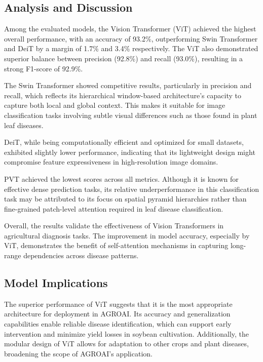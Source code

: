 \documentclass[preprint,12pt]{elsarticle}
\begin{document}
\subsection{Analysis and Discussion}

Among the evaluated models, the Vision Transformer (ViT) achieved the highest overall performance, with an accuracy of 93.2\%, outperforming Swin Transformer and DeiT by a margin of 1.7\% and 3.4\% respectively. The ViT also demonstrated superior balance between precision (92.8\%) and recall (93.0\%), resulting in a strong F1-score of 92.9\%.

The Swin Transformer showed competitive results, particularly in precision and recall, which reflects its hierarchical window-based architecture’s capacity to capture both local and global context. This makes it suitable for image classification tasks involving subtle visual differences such as those found in plant leaf diseases.

DeiT, while being computationally efficient and optimized for small datasets, exhibited slightly lower performance, indicating that its lightweight design might compromise feature expressiveness in high-resolution image domains.

PVT achieved the lowest scores across all metrics. Although it is known for effective dense prediction tasks, its relative underperformance in this classification task may be attributed to its focus on spatial pyramid hierarchies rather than fine-grained patch-level attention required in leaf disease classification.

Overall, the results validate the effectiveness of Vision Transformers in agricultural diagnosis tasks. The improvement in model accuracy, especially by ViT, demonstrates the benefit of self-attention mechanisms in capturing long-range dependencies across disease patterns.

\subsection{Model Implications}

The superior performance of ViT suggests that it is the most appropriate architecture for deployment in AGROAI. Its accuracy and generalization capabilities enable reliable disease identification, which can support early intervention and minimize yield losses in soybean cultivation. Additionally, the modular design of ViT allows for adaptation to other crops and plant diseases, broadening the scope of AGROAI’s application.
\end{document}
